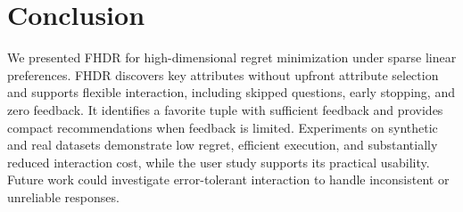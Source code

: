 \section{Conclusion}
\label{sec:concl}

We presented FHDR for high-dimensional regret minimization under sparse linear preferences. FHDR discovers key attributes without upfront attribute selection and supports flexible interaction, including skipped questions, early stopping, and zero feedback. It identifies a favorite tuple with sufficient feedback and provides compact recommendations when feedback is limited. Experiments on synthetic and real datasets demonstrate low regret, efficient execution, and substantially reduced interaction cost, while the user study supports its practical usability. Future work could investigate error-tolerant interaction to handle inconsistent or unreliable responses.

\clearpage
